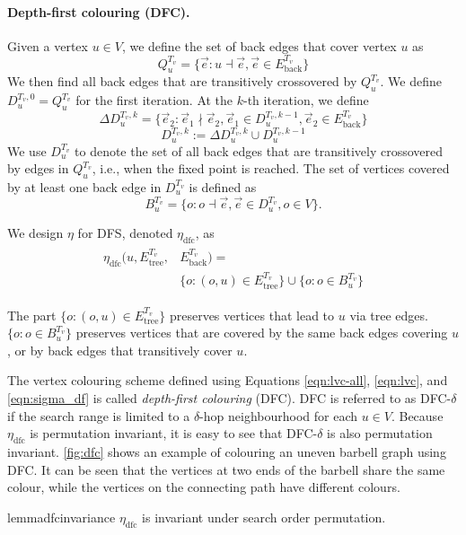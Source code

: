 \paragraph{Depth-first colouring (DFC).} Given a vertex $u\in V$, we define the set of back edges that cover vertex $u$ as
\begin{equation}
\label{eqn:dfc_qu}
    Q_u^{T_v} = \{ \vec{e}:{u \dashv \vec{e}, \vec{e} \in E_{\text{back}}^{T_v}} \}
\end{equation}
We then find all back edges that are transitively crossovered by $Q_u^{T_v}$. We define $D_u^{T_v,0} = Q_u^{T_v}$ for the first iteration. At the $k$-th iteration, we define
\begin{equation*}
    \Delta D_u^{T_v,k} = \{ \vec{e}_2: \vec{e}_1 \nmid \vec{e}_2, \vec{e}_1 \in D_u^{T_v, k-1}, \vec{e}_2 \in E_{\text{back}}^{T_v}  \}
\end{equation*}
\begin{equation*}
    D_u^{T_v,k} := \Delta D_u^{T_v,k}\cup D_u^{T_v, k-1}
\end{equation*}
We use $D_u^{T_v}$ to denote the set of all back edges that are transitively crossovered by edges in $Q_u^{T_v}$, i.e., when the fixed point is reached. The set of vertices covered by at least one back edge in $D_u^{T_v}$ is defined as 
\begin{equation}
\label{eqn:dfs_bu}
    B_u^{T_v} = \{o: o \dashv \vec{e}, \vec{e} \in D^{T_v}_u, o \in V\}.
\end{equation}

We design $\eta$ for DFS, denoted $\eta_{\text{dfc}}$, as
\begin{align}
\label{eqn:sigma_df}
\begin{split}
    \eta_{\text{dfc}}(u, E_{\text{tree}}^{T_v}, &E_{\text{back}}^{T_v}) = \\
    & \{o: (o,u) \in E_{\text{tree}}^{T_v}  \}
    \cup 
    \{o: o \in B_u^{T_v}\}
\end{split}
\end{align}

The part $\{o: (o,u) \in E_{\text{tree}}^{T_v}\}$ preserves vertices that lead to $u$ via tree edges. 
$\{o: o \in B_u^{T_v}\}$ preserves vertices that are covered by the same back edges covering $u$, or by back edges that transitively cover $u$.

The vertex colouring scheme defined using Equations \ref{eqn:lvc-all}, \ref{eqn:lvc}, and \ref{eqn:sigma_df} is called \textit{depth-first colouring} (DFC).
DFC is referred to as DFC-$\delta$ if the search range is limited to a $\delta$-hop neighbourhood for each $u\in V$. Because $\eta_{\text{dfc}}$ is permutation invariant, it is easy to see that DFC-$\delta$ is also permutation invariant.
\cref{fig:dfc} shows an example of colouring an uneven barbell graph using DFC. It can be seen that the vertices at two ends of the barbell share the same colour, while the vertices on the connecting path have different colours.
\begin{restatable}[]{lemma}{dfcinvariance}
\label{lemma:dfcinvariance}
$\eta_{\text{dfc}}$ is invariant under search order permutation.
\end{restatable}



